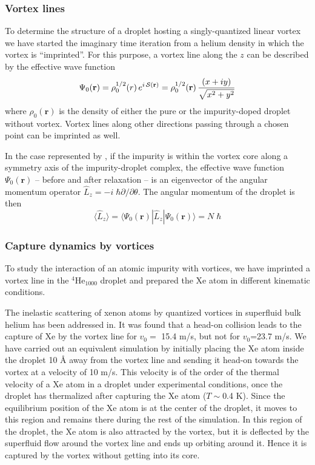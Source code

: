 	\subsubsection*{Vortex lines}
	To determine the structure of a droplet hosting a singly-quantized linear vortex 
we have started the imaginary time iteration from a helium  
density in which the vortex is ``imprinted''. For this purpose, a vortex line
along the $z$  can be described by the effective wave function 
%
\begin{equation}
\Psi_0(\mathbf{r}) =  \rho_0^{1/2}(r) \, e^{i  \, {\cal S}(\mathbf{r})} = \rho_0^{1/2}(\mathbf{r}) \, \frac{(x + i y)}{\sqrt{x^2 + y^2}} 
\label{eq11}
\end{equation}
%
where $\rho_0(\mathbf{r})$ is the density of 
either the pure or  the impurity-doped droplet without vortex.  
Vortex lines along other directions passing through a chosen point 
can be imprinted as well\citep{Pi07}.
 
In the case represented by , if the impurity is within the vortex
core along a symmetry axis of the impurity-droplet complex,
the effective wave function $\Psi_0({\mathbf r})$ -- before and after relaxation -- is an eigenvector of the  angular 
momentum operator  $\hat{L}_z = -i \; \hbar \partial/\partial \theta$. 
The angular momentum of the droplet is then
\begin{equation}
\langle \hat{L}_z \rangle = \langle \Psi_0(\mathbf{r}) | \hat{L}_z  | \Psi_0(\mathbf{r}) \rangle = N \; \hbar
\label{eq12}
\end{equation}
%

	\subsubsection*{Capture dynamics by vortices}
	To study the interaction of an atomic impurity with vortices, 
we have imprinted a vortex line in the $^4$He$_{1000}$ droplet 
and prepared the Xe atom in different kinematic conditions. 
 
 The inelastic scattering of xenon atoms by quantized vortices in superfluid bulk helium has been addressed in.
  It was found that
  a head-on collision leads to the capture of Xe by the vortex line for $v_0=$ 15.4 m/s, but not  for $v_0$=23.7 m/s.
We have carried out  an equivalent  simulation by initially placing
 the Xe atom  inside the droplet 10 \AA{} away
from the vortex line and   sending it  head-on towards the vortex at a velocity of 10 m/s.
This velocity  is of the order of the thermal velocity of a Xe atom in a droplet under experimental conditions,
once the droplet has thermalized after capturing the Xe atom  ($T \sim$0.4 K)\citep{Toe04}. 
Since the equilibrium position of  the Xe atom is at the center of the droplet, it  moves to this region and remains there during the rest of the simulation.
In this region of the droplet, the Xe atom is also attracted by the vortex, but it is deflected by the superfluid flow around the vortex line and ends up orbiting around it.
 Hence it is captured by the vortex without getting into its  core.
 
